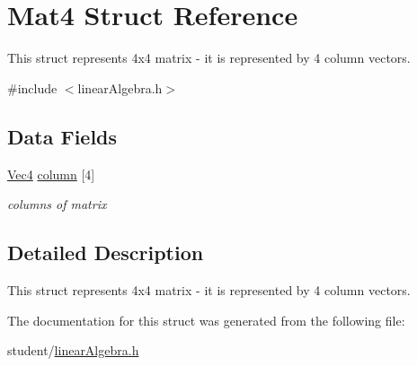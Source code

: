 \hypertarget{structMat4}{}\section{Mat4 Struct Reference}
\label{structMat4}


This struct represents 4x4 matrix -\/ it is represented by 4 column vectors.  




{\ttfamily \#include $<$linear\+Algebra.\+h$>$}

\subsection*{Data Fields}
\begin{DoxyCompactItemize}
\item 
\mbox{\label{structMat4_a89c6922a5ca3584062e9841090709592}} 
\hyperlink{structVec4}{Vec4} \hyperlink{structMat4_a89c6922a5ca3584062e9841090709592}{column} \mbox{[}4\mbox{]}
\begin{DoxyCompactList}\small\item\em columns of matrix \end{DoxyCompactList}\end{DoxyCompactItemize}


\subsection{Detailed Description}
This struct represents 4x4 matrix -\/ it is represented by 4 column vectors. 

The documentation for this struct was generated from the following file\+:\begin{DoxyCompactItemize}
\item 
student/\hyperlink{linearAlgebra_8h}{linear\+Algebra.\+h}\end{DoxyCompactItemize}

